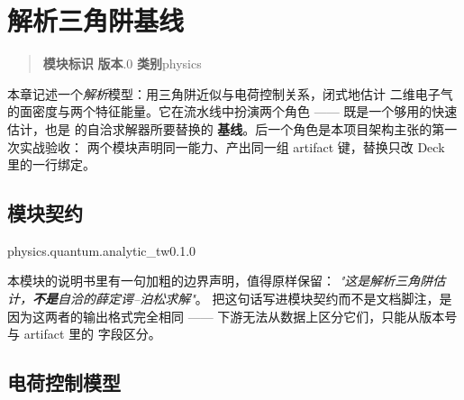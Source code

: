 
\chapter{解析三角阱基线}
\label{ch:analytic_tw}

\begin{quote}
\small
\noindent\textbf{模块标识}\quad{}\qquad
\textbf{版本}.0\qquad
\textbf{类别}\quad physics
\end{quote}

\noindent
本章记述一个\emph{解析}模型：用三角阱近似与电荷控制关系，闭式地估计
二维电子气的面密度与两个特征能量。它在流水线中扮演两个角色 ——
既是一个够用的快速估计，也是  的自洽求解器所要替换的
\textbf{基线}。后一个角色是本项目架构主张的第一次实战验收：
两个模块声明同一能力、产出同一组 artifact 键，替换只改 Deck 里的一行绑定。

\section{模块契约}
\label{sec:tw-contract}

\begin{modulecard}{physics.quantum.analytic\_tw}{0.1.0}
  \cardsep
\end{modulecard}

本模块的说明书里有一句加粗的边界声明，值得原样保留：
\emph{"这是解析三角阱估计，\textbf{不是}自洽的薛定谔--泊松求解"}。
把这句话写进模块契约而不是文档脚注，是因为这两者的输出格式完全相同 ——
下游无法从数据上区分它们，只能从版本号与 artifact 里的  字段区分。

\section{电荷控制模型}
\label{sec:tw-model}

